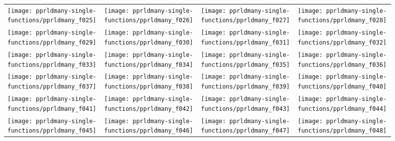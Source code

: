 \documentclass[sigconf]{acmart}
\begin{document}
{%
\begin{figure*}
\centering
\begin{tabular}{l@{\hspace*{-0.00\textwidth}}l@{\hspace*{0.01\textwidth}}|l@{\hspace*{-0.00\textwidth}}l}
\texttt{[image: pprldmany-single-functions/pprldmany\_f025]}&
\texttt{[image: pprldmany-single-functions/pprldmany\_f026]}&
\texttt{[image: pprldmany-single-functions/pprldmany\_f027]}&
\texttt{[image: pprldmany-single-functions/pprldmany\_f028]}\\[-0.2em]
\texttt{[image: pprldmany-single-functions/pprldmany\_f029]}&
\texttt{[image: pprldmany-single-functions/pprldmany\_f030]}&
\texttt{[image: pprldmany-single-functions/pprldmany\_f031]}&
\texttt{[image: pprldmany-single-functions/pprldmany\_f032]}\\[-0.2em]
\texttt{[image: pprldmany-single-functions/pprldmany\_f033]}&
\texttt{[image: pprldmany-single-functions/pprldmany\_f034]}&
\texttt{[image: pprldmany-single-functions/pprldmany\_f035]}&
\texttt{[image: pprldmany-single-functions/pprldmany\_f036]}\\[-0.2em]
\texttt{[image: pprldmany-single-functions/pprldmany\_f037]}&
\texttt{[image: pprldmany-single-functions/pprldmany\_f038]}&
\texttt{[image: pprldmany-single-functions/pprldmany\_f039]}&
\texttt{[image: pprldmany-single-functions/pprldmany\_f040]}\\[-0.2em]
\texttt{[image: pprldmany-single-functions/pprldmany\_f041]}&
\texttt{[image: pprldmany-single-functions/pprldmany\_f042]}&
\texttt{[image: pprldmany-single-functions/pprldmany\_f043]}&
\texttt{[image: pprldmany-single-functions/pprldmany\_f044]}\\[-0.2em]
\texttt{[image: pprldmany-single-functions/pprldmany\_f045]}&
\texttt{[image: pprldmany-single-functions/pprldmany\_f046]}&
\texttt{[image: pprldmany-single-functions/pprldmany\_f047]}&
\texttt{[image: pprldmany-single-functions/pprldmany\_f048]}
\vspace*{-1ex}
\end{tabular}
 \caption{\label{fig:ECDFsingleOne}
}
\end{figure*}

}
\end{document}
